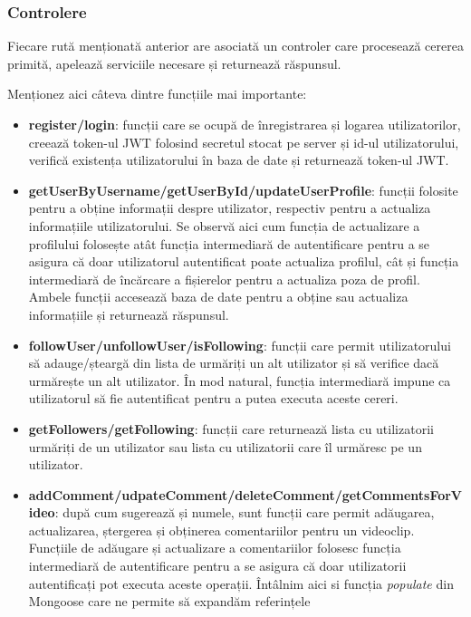 \subsubsection{Controlere}
Fiecare rută menționată anterior are asociată un controler care procesează cererea primită, 
apelează serviciile necesare și returnează răspunsul.
\par
Menționez aici câteva dintre funcțiile mai importante:

\begin{itemize}
    \item \textbf{register/login}: funcții care se ocupă de înregistrarea și logarea utilizatorilor,
    creează token-ul JWT folosind secretul stocat pe server și id-ul utilizatorului, verifică
    existența utilizatorului în baza de date și returnează token-ul JWT.
    \item \textbf{getUserByUsername/getUserById/updateUserProfile}: funcții folosite pentru a obține informații
    despre utilizator, respectiv pentru a actualiza informațiile utilizatorului. Se observă aici
    cum funcția de actualizare a profilului folosește atât funcția intermediară de autentificare pentru a
    se asigura că doar utilizatorul autentificat poate actualiza profilul, cât și funcția intermediară
    de încărcare a fișierelor pentru a actualiza poza de profil. Ambele funcții accesează baza de
    date pentru a obține sau actualiza informațiile și returnează răspunsul.
    \item \textbf{followUser/unfollowUser/isFollowing}: funcții care permit utilizatorului să adauge/șteargă
    din lista de urmăriți un alt utilizator și să verifice dacă urmărește un alt utilizator. În mod natural,
    funcția intermediară impune ca utilizatorul să fie autentificat pentru a putea executa aceste cereri.
    \item \textbf{getFollowers/getFollowing}: funcții care returnează lista cu utilizatorii urmăriți de
    un utilizator sau lista cu utilizatorii care îl urmăresc pe un utilizator. 
    \item \textbf{addComment/udpateComment/deleteComment/getCommentsForVideo}: după cum sugerează
    și numele, sunt funcții care permit adăugarea, actualizarea, ștergerea și obținerea comentariilor
    pentru un videoclip. Funcțiile de adăugare și actualizare a comentariilor folosesc funcția intermediară
    de autentificare pentru a se asigura că doar utilizatorii autentificați pot executa aceste operații.
    Întâlnim aici si funcția \textit{populate} din Mongoose care ne permite să expandăm referințele

\end{itemize}
